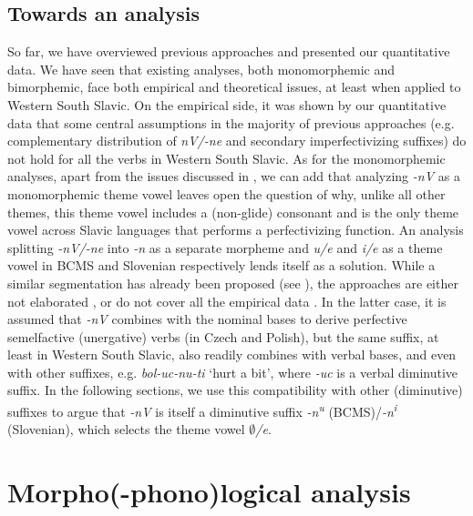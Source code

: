 \documentclass[output=paper,colorlinks,citecolor=brown]{langscibook}
\begin{document}
\subsection{Towards an analysis} \label{str:subsect:Towards an analysis}
So far, we have overviewed previous approaches and presented our quantitative data. We have seen that existing analyses, both monomorphemic and bimorphemic, face both empirical and theoretical issues, at least when applied to Western South Slavic. On the empirical side, it was shown by our quantitative data that some central assumptions in the majority of previous approaches (e.g. complementary distribution of \textit{nV/-ne} and secondary imperfectivizing suffixes) do not hold for all the verbs in Western South Slavic. As for the monomorphemic analyses, apart from the issues discussed in , we can add that analyzing \textit{\nobreakdash-nV} as a monomorphemic theme vowel leaves open the question of why, unlike all other themes, this theme vowel includes a (non-glide) consonant and is the only theme vowel across Slavic languages that performs a perfectivizing function. An analysis splitting \textit{-nV/-ne} into \textit{-n} as a separate morpheme and \textit{u/e} and \textit{i/e} as a theme vowel in BCMS and Slovenian respectively lends itself as a solution. While a similar segmentation has already been proposed (see ), the approaches are either not elaborated \citep{sta+:Lazorczyk2010}, or do not cover all the empirical data \citep{TaraldsenMedovaWiland2019, Wiland2019}. In the latter case, it is assumed that \textit{-nV} combines with the nominal bases to derive perfective semelfactive (unergative) verbs (in Czech and Polish), but the same suffix, at least in Western South Slavic, also readily combines with verbal bases, and even with other suffixes, e.g. \textit{bol-uc-nu-ti} `hurt a bit', where \textit{-uc} is a verbal diminutive suffix. In the following sections, we use this compatibility with other (diminutive) suffixes to argue that \textit{-nV} is itself a diminutive suffix \textit{-n\textsuperscript{u}} (BCMS)/\textit{-n\textsuperscript{i}} (Slovenian), which selects the theme vowel \textit{$∅$/e}.

\section{Morpho(-phono)logical analysis} \label{str:sect:Morpho-phono analysis}
\end{document}

